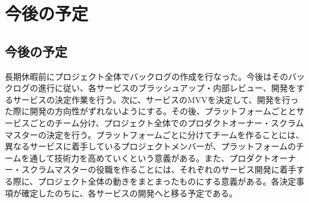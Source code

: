 \chapter{今後の予定}
\section{今後の予定}

長期休暇前にプロジェクト全体でバックログの作成を行なった。今後はそのバックログの進行に従い、各サービスのブラッシュアップ・内部レビュー、開発をするサービスの決定作業を行う。次に、サービスのMVVを決定して、開発を行った際に開発の方向性がずれないようにする。その後、プラットフォームごととサービスごとのチーム分け、プロジェクト全体でのプロダクトオーナー・スクラムマスターの決定を行う。プラットフォームごとに分けてチームを作ることには、異なるサービスに着手しているプロジェクトメンバーが、プラットフォームのチームを通して技術力を高めていくという意義がある。また、プロダクトオーナー・スクラムマスターの役職を作ることには、それぞれのサービス開発に着手する際に、プロジェクト全体の動きをまとまったものにする意義がある。各決定事項が確定したのちに、各サービスの開発へと移る予定である。

